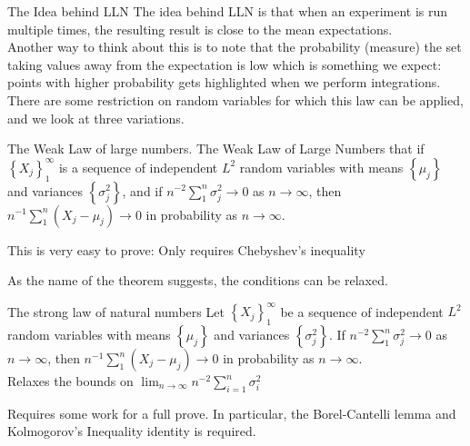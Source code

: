 \documentclass{beamer}
\begin{document}
\begin{frame}{The Idea behind LLN}
    The idea behind LLN is that when an experiment is run multiple times, the resulting result is close to the mean expectations.\\\pause Another way to think about this is to note that the probability (measure) the set taking values away from the expectation is low which is something we expect: points with higher probability gets highlighted when we perform integrations.\\\pause
    There are some restriction on random variables for which this law can be applied, and we look at three variations.
\end{frame}
\newcommand{\cmark}{\ding{51}}%
\newcommand{\xmark}{\ding{55}}%
\begin{frame}{The Weak Law of large numbers.}
    The Weak Law of Large Numbers that if $\left\{X_j\right\}_1^{\infty}$ is a sequence of independent $L^2$ random variables with means $\left\{\mu_j\right\}$ and variances $\left\{\sigma_j^2\right\}$, and if $n^{-2} \sum_1^n \sigma_j^2 \rightarrow 0$ as $n \rightarrow \infty$, then $n^{-1} \sum_1^n\left(X_j-\mu_j\right) \rightarrow 0$ in probability as $n \rightarrow \infty$.\\\pause\vfil

    \noindent
    \cmark This is very easy to prove: Only requires Chebyshev's inequality\\\pause

    \noindent
    \xmark As the name of the theorem suggests, the conditions can be relaxed.
\end{frame}

\begin{frame}{The strong law of natural numbers}
    Let $\left\{X_j\right\}_1^{\infty}$ be a sequence of independent $L^2$ random variables with means $\left\{\mu_j\right\}$ and variances $\left\{\sigma_j^2\right\}$. If $n^{-2} \sum_1^n \sigma_j^2 \rightarrow 0$ as $n \rightarrow \infty$, then $n^{-1} \sum_1^n\left(X_j-\mu_j\right) \rightarrow 0$ in probability as $n \rightarrow \infty$.\\
    \noindent
    \cmark Relaxes the bounds on $\lim_{n\to\infty}n^{-2}\sum_{i=1}^n\sigma_i^2$\\\pause


    \noindent
    \xmark Requires some work for a full prove. In particular, the  Borel-Cantelli lemma and Kolmogorov's Inequality identity is required. 
\end{frame}
\end{document}
